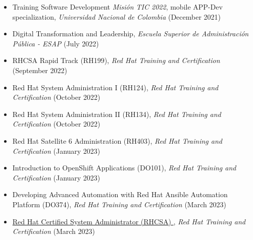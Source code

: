 \documentclass[overlapped,line,final]{../../templates/MichaelDeCorteCV/lib/res}
\begin{document}
\begin{resume}
\begin{itemize}
	\item Training Software Development \textit{Misión TIC 2022}, mobile APP-Dev specialization, \textit{Universidad Nacional de Colombia} (December 2021) \href{https://raw.githubusercontent.com/dtorot/NemqCV/profile-engineer/latex/docs/CC_79948255-ProgMINTIC2021.pdf}{}
	\item Digital Transformation and Leadership, \textit{Escuela Superior de Administración Pública - ESAP} (July 2022)  \href{https://raw.githubusercontent.com/dtorot/NemqCV/profile-engineer/latex/docs/esapCert2022.pdf}{}	
	\item RHCSA Rapid Track (RH199), \textit{Red Hat Training and Certification} (September 2022) \href{https://raw.githubusercontent.com/dtorot/NemqCV/profile-engineer/latex/docs/Certificate of Attendance (RH199-8.0).pdf}{}
	\item Red Hat System Administration I (RH124), \textit{Red Hat Training and Certification} (October 2022) \href{https://raw.githubusercontent.com/dtorot/NemqCV/profile-engineer/latex/docs/Certificate of Attendance_RH124-9_0.pdf}{}	
	\item Red Hat System Administration II (RH134), \textit{Red Hat Training and Certification} (October 2022) \href{https://raw.githubusercontent.com/dtorot/NemqCV/profile-engineer/latex/docs/Certificate of Attendance (RH134-9.0).pdf}{}
	\item Red Hat Satellite 6 Administration (RH403), \textit{Red Hat Training and Certification} (January 2023) \href{https://raw.githubusercontent.com/dtorot/NemqCV/profile-engineer/latex/docs/Certificate of Attendance (RH403-6.6).pdf}{}
	\item Introduction to OpenShift Applications (DO101), \textit{Red Hat Training and Certification} (January 2023) \href{https://raw.githubusercontent.com/dtorot/NemqCV/profile-engineer/latex/docs/Certificate of Attendance (DO101-4.6).pdf}{}
	\item Developing Advanced Automation with Red Hat Ansible Automation Platform (DO374), \textit{Red Hat Training and Certification} (March 2023) \href{https://raw.githubusercontent.com/dtorot/NemqCV/profile-engineer/latex/docs/Certificate of Attendance (DO374).pdf}{}
	\item \href{https://raw.githubusercontent.com/dtorot/NemqCV/profile-engineer/latex/docs/Red_Hat_Certified_System_Administrator_RHCSA_Badge20230403_28_153keud.pdf}{Red Hat Certified System Administrator (RHCSA) }, \textit{Red Hat Training and Certification} (March 2023) 

\end{itemize}
\end{resume}
\end{document}
